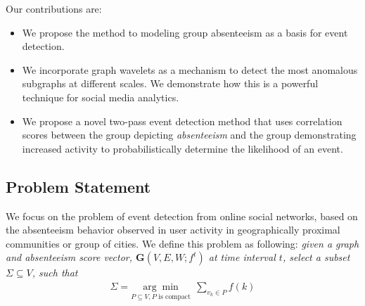 Our contributions are:
\begin{itemize}
\item We propose the method to modeling group absenteeism as a basis for event detection.
\item We incorporate graph wavelets as a mechanism to detect the most anomalous subgraphs at different scales. We demonstrate how this is a powerful technique for social media analytics.
\item We propose a novel two-pass event detection method that uses correlation scores between the group depicting \textit{absenteeism} and the group demonstrating increased activity to probabilistically determine the likelihood of an event.
\end{itemize}



\subsection{Problem Statement}
\label{sec:problemformulation}
We focus on the problem of event detection from online social networks, based on the absenteeism behavior observed in user activity in geographically proximal communities or group of cities.
We define this problem as following: \emph{given a graph and \textit{absenteeism score} vector, $\mathbf{G}(V,E,W;f^t)$ at time interval $t$, select a subset $\Sigma \subseteq V$, such that
\vspace{-0.5em}
\begin{eqnarray}
 \label{eq: problem}
    \Sigma=\underset{P\subseteq V, P \mbox{ is compact}}{\arg\min}\ \ \sum_{v_k\in P} {f(k)}
\end{eqnarray} }

